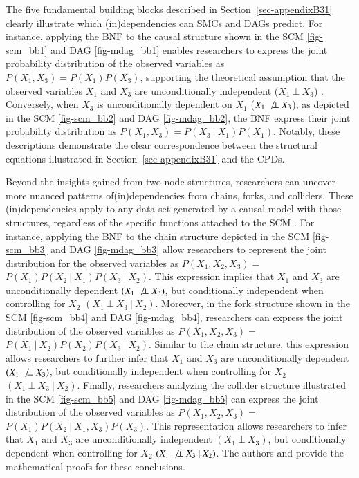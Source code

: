 \documentclass[
  authoryear,
  review,
  1p]{elsarticle}
\begin{document}
The five fundamental building blocks described in
Section~\ref{sec-appendixB31} clearly illustrate which (in)dependencies
can SMCs and DAGs predict. For instance, applying the BNF to the causal
structure shown in the SCM \ref{fig-scm_bb1} and DAG \ref{fig-mdag_bb1}
enables researchers to express the joint probability distribution of the
observed variables as \(P(X_{1}, X_{3}) = P(X_{1}) P(X_{3})\),
supporting the theoretical assumption that the observed variables
\(X_{1}\) and \(X_{3}\) are unconditionally independent
(\(X_{1} \:\bot\:X_{3}\)) \citep[pp.~24]{Neal_2020}. Conversely, when
\(X_{3}\) is unconditionally dependent on \(X_{1}\)
(\(X_{1} \:\not\bot\:X_{3}\)), as depicted in the SCM \ref{fig-scm_bb2}
and DAG \ref{fig-mdag_bb2}, the BNF express their joint probability
distribution as \(P(X_{1}, X_{3}) = P(X_{3} \:|\:X_{1}) P(X_{1})\).
Notably, these descriptions demonstrate the clear correspondence between
the structural equations illustrated in Section~\ref{sec-appendixB31}
and the CPDs.

Beyond the insights gained from two-node structures, researchers can
uncover more nuanced patterns of(in)dependencies from chains, forks, and
colliders. These (in)dependencies apply to any data set generated by a
causal model with those structures, regardless of the specific functions
attached to the SCM \citep[pp.~36]{Pearl_et_al_2016}. For instance,
applying the BNF to the chain structure depicted in the SCM
\ref{fig-scm_bb3} and DAG \ref{fig-mdag_bb3} allow researchers to
represent the joint distribution for the observed variables as
\(P(X_{1},X_{2},X_{3}) =\)
\(P(X_{1}) P(X_{2} \:|\:X_{1}) P(X_{3} \:|\:X_{2})\). This expression
implies that \(X_{1}\) and \(X_{3}\) are unconditionally dependent
\((X_{1} \:\not\bot\:X_{3})\), but conditionally independent when
controlling for \(X_{2}\) \((X_{1} \:\bot\:X_{3} \:|\:X_{2})\).
Moreover, in the fork structure shown in the SCM \ref{fig-scm_bb4} and
DAG \ref{fig-mdag_bb4}, researchers can express the joint distribution
of the observed variables as \(P(X_{1},X_{2},X_{3}) =\)
\(P(X_{1} \:|\:X_{2}) P(X_{2}) P(X_{3} \:|\:X_{2})\). Similar to the
chain structure, this expression allows researchers to further infer
that \(X_{1}\) and \(X_{3}\) are unconditionally dependent
\((X_{1} \:\not\bot\:X_{3})\), but conditionally independent when
controlling for \(X_{2}\) \((X_{1} \:\bot\:X_{3} \:|\:X_{2})\). Finally,
researchers analyzing the collider structure illustrated in the SCM
\ref{fig-scm_bb5} and DAG \ref{fig-mdag_bb5} can express the joint
distribution of the observed variables as \(P(X_{1},X_{2},X_{3}) =\)
\(P(X_{1}) P(X_{2} \:|\:X_{1}, X_{3}) P(X_{3})\). This representation
allows researchers to infer that \(X_{1}\) and \(X_{3}\) are
unconditionally independent \((X_{1} \:\bot\:X_{3})\), but conditionally
dependent when controlling for \(X_{2}\)
\((X_{1} \:\not\bot\:X_{3} \:|\:X_{2})\). The authors \citet[pp.~37, 40,
41]{Pearl_et_al_2016} and \citet[pp.~25--26]{Neal_2020} provide the
mathematical proofs for these conclusions.
\end{document}
